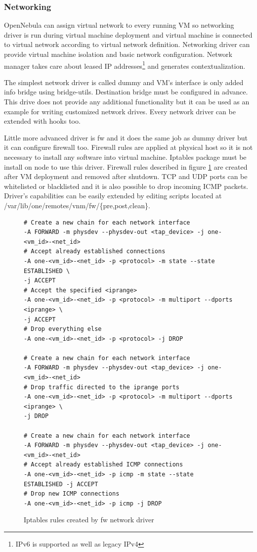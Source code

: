 \subsubsection{Networking}
OpenNebula can assign virtual network to every running \Ac{VM} so networking driver is run during virtual machine deployment and virtual machine is connected to virtual network according to virtual network definition. Networking driver can provide virtual machine isolation and basic network configuration. Network manager takes care about leased \Ac{IP} addresses\footnote{\Ac{IPv6} is supported as well as legacy \Ac{IPv4}} and generates contextualization.

The simplest network driver is called dummy and \Ac{VM}'s interface is only added info bridge using bridge-utils. Destination bridge must be configured in advance. This drive does not provide any additional functionality but it can be used as an example for writing customized network drives. Every network driver can be extended with hooks too.

Little more advanced driver is fw and it does the same job as dummy driver but it can configure firewall too. Firewall rules are applied at physical host so it is not necessary to install any software into virtual machine. Iptables package must be install on node to use this driver. Firewall rules described in figure \ref{code:fw} are created after \Ac{VM} deployment and removed after shutdown. \Ac{TCP} and \Ac{UDP} ports can be whitelisted or blacklisted and it is also possible to drop incoming \Ac{ICMP} packets. Driver's capabilities can be easily extended by editing scripts located at /var/lib/one/remotes/vnm/fw/\{pre,post,clean\}.

\begin{figure}[htb]
\caption{Iptables rules created by fw network driver}
\label{code:fw}
\begin{verbatim}
# Create a new chain for each network interface
-A FORWARD -m physdev --physdev-out <tap_device> -j one-<vm_id>-<net_id>
# Accept already established connections
-A one-<vm_id>-<net_id> -p <protocol> -m state --state ESTABLISHED \
-j ACCEPT
# Accept the specified <iprange>
-A one-<vm_id>-<net_id> -p <protocol> -m multiport --dports <iprange> \
-j ACCEPT
# Drop everything else
-A one-<vm_id>-<net_id> -p <protocol> -j DROP

# Create a new chain for each network interface
-A FORWARD -m physdev --physdev-out <tap_device> -j one-<vm_id>-<net_id>
# Drop traffic directed to the iprange ports
-A one-<vm_id>-<net_id> -p <protocol> -m multiport --dports <iprange> \
-j DROP

# Create a new chain for each network interface
-A FORWARD -m physdev --physdev-out <tap_device> -j one-<vm_id>-<net_id>
# Accept already established ICMP connections
-A one-<vm_id>-<net_id> -p icmp -m state --state ESTABLISHED -j ACCEPT
# Drop new ICMP connections
-A one-<vm_id>-<net_id> -p icmp -j DROP
\end{verbatim}
\end{figure}


